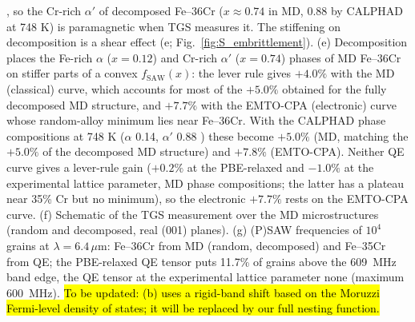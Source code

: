 \documentclass[final,3p,times]{elsarticle}
\DeclareRobustCommand{\upd}[1]{{\sethlcolor{yellow}\hl{To be updated: #1}}}
\begin{document}
\cite{xiong2011improved}, so the Cr-rich $\alpha'$ of decomposed Fe--36Cr ($x\approx0.74$ in MD, 0.88 by CALPHAD at 748 K) is paramagnetic when TGS measures it. The stiffening on decomposition is a shear effect (e; Fig.~\ref{fig:S_embrittlement}). (e) Decomposition places the Fe-rich $\alpha$ ($x=0.12$) and Cr-rich $\alpha'$ ($x=0.74$) phases of MD Fe--36Cr on stiffer parts of a convex $f_{\mathrm{SAW}}(x)$: the lever rule gives $+4.0\%$ with the MD (classical) curve, which accounts for most of the $+5.0\%$ obtained for the fully decomposed MD structure, and $+7.7\%$ with the EMTO-CPA (electronic) curve whose random-alloy minimum lies near Fe--36Cr. With the CALPHAD phase compositions at 748 K ($\alpha$ 0.14, $\alpha'$ 0.88 \cite{xiong2011improved}) these become $+5.0\%$ (MD, matching the $+5.0\%$ of the decomposed MD structure) and $+7.8\%$ (EMTO-CPA). Neither QE curve gives a lever-rule gain ($+0.2\%$ at the PBE-relaxed and $-1.0\%$ at the experimental lattice parameter, MD phase compositions; the latter has a plateau near 35\% Cr but no minimum), so the electronic $+7.7\%$ rests on the EMTO-CPA curve. (f) Schematic of the TGS measurement over the MD microstructures (random and decomposed, real (001) planes). (g) (P)SAW frequencies of $10^4$ grains at $\lambda=6.4\,\mu$m: Fe--36Cr from MD (random, decomposed) and Fe--35Cr from QE; the PBE-relaxed QE tensor puts 11.7\% of grains above the 609~MHz band edge, the QE tensor at the experimental lattice parameter none (maximum 600~MHz). \upd{(b) uses a rigid-band shift based on the Moruzzi Fermi-level density of states; it will be replaced by our full nesting function.}
\clearpage
\end{document}
